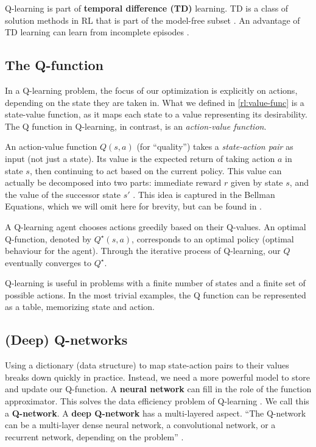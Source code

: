 Q-learning is part of \textbf{temporal difference (TD)} learning.
TD is a class of solution methods in RL that is part of the model-free subset \cite{rlai}.
An advantage of TD learning can learn from incomplete episodes \cite{long-peak-rl}.

\subsection{The Q-function}
In a Q-learning problem, the focus of our optimization is explicitly on actions, depending on the state they are taken in.
What we defined in \ref{rl:value-func} is a state-value function, as it maps each state to a value representing its desirability.
The Q function in Q-learning, in contrast, is an \emph{action-value function}.

An action-value function \(Q(s, a)\) (for ``quality'') takes a \emph{state-action pair} as input (not just a state).
Its value is the expected return of taking action \(a\) in state \(s\), then continuing to act based on the current policy.
This value can actually be decomposed into two parts: immediate reward \(r\) given by state \(s\), and the value of the successor state \({s}'\) \cite{silver-lectures}.
This idea is captured in the Bellman Equations, which we will omit here for brevity, but can be found in \cite{rlai, silver-lectures}.

A Q-learning agent chooses actions greedily based on their Q-values.
An optimal Q-function, denoted by  \(Q^{\star}(s, a)\), corresponds to an optimal policy (optimal behaviour for the agent).
Through the iterative process of Q-learning, our \(Q\) eventually converges to \(Q^{\star}\).

Q-learning is useful in problems with a finite number of states and a finite set of possible actions.
In the most trivial examples, the Q function can be represented as a table, memorizing state and action.

\subsection{(Deep) Q-networks}

Using a dictionary (data structure) to map state-action pairs to their values breaks down quickly in practice.
Instead, we need a more powerful model to store and update our Q-function.
A \textbf{neural network} can fill in the role of the function approximator.
This solves the data efficiency problem of Q-learning \cite{long-peak-rl}.
We call this a \textbf{Q-network}.
A \textbf{deep Q-network} has a multi-layered aspect.
``The Q-network can be a multi-layer dense neural network, a convolutional network, or a recurrent network, depending on the problem'' \cite{long-peak-rl}.

